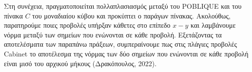 Στη συνέχεια, πραγματοποιείται πολλαπλασιασμός μεταξύ του \textlatin{POBLIQUE} και του πίνακα $C$ του μοναδιαίου κύβου και προκύπτει ο παράγων πίνακας. Ακολούθως, παρατηρούμε ποιες προβολές υπήρξαν κάθετες στο επίπεδο $x-y$ και λαμβάνουμε νόρμα μεταξύ των σημείων που ενώνονται σε κάθε προβολή. Εξετάζοντας τα αποτελέσματα των παραπάνω πράξεων, συμπεραίνουμε πως στις πλάγιες προβολές \textlatin{Cabinet} το αποτέλεσμα της νόρμας των δύο σημείων που ενώνονται σε κάθε προβολή είναι μισό του αρχικού μήκους (Δρακόπουλος, 2022). \par
